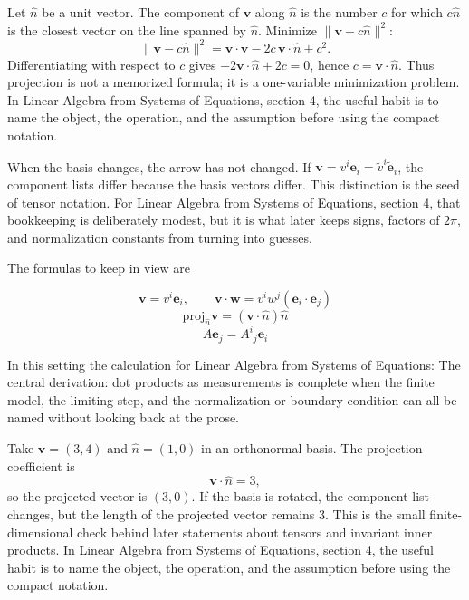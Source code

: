 Let \(\hat n\) be a unit vector.  The component of \(\bm v\) along \(\hat n\) is the number \(c\) for which \(c\hat n\) is the closest vector on the line spanned by \(\hat n\).  Minimize \(\|\bm v-c\hat n\|^2\):
\[
  \|\bm v-c\hat n\|^2=\bm v\cdot\bm v-2c\,\bm v\cdot\hat n+c^2.
\]
Differentiating with respect to \(c\) gives \(-2\bm v\cdot\hat n+2c=0\), hence \(c=\bm v\cdot\hat n\).  Thus projection is not a memorized formula; it is a one-variable minimization problem.  In Linear Algebra from Systems of Equations, section 4, the useful habit is to name the object, the operation, and the assumption before using the compact notation.

When the basis changes, the arrow has not changed.  If \(\bm v=v^i\bm e_i=\tilde v^i\tilde{\bm e}_i\), the component lists differ because the basis vectors differ.  This distinction is the seed of tensor notation.  For Linear Algebra from Systems of Equations, section 4, that bookkeeping is deliberately modest, but it is what later keeps signs, factors of \(2\pi\), and normalization constants from turning into guesses.

The formulas to keep in view are

\[
  \bm v=v^i\bm e_i,\qquad \bm v\cdot\bm w=v^iw^j(\bm e_i\cdot\bm e_j)
\]
\[
  \mathrm{proj}_{\hat n}\bm v=(\bm v\cdot\hat n)\hat n
\]
\[
  A\bm e_j=A^i{}_j\bm e_i
\]

In this setting the calculation for Linear Algebra from Systems of Equations: The central derivation: dot products as measurements is complete when the finite model, the limiting step, and the normalization or boundary condition can all be named without looking back at the prose.




\begin{example}
Take \(\bm v=(3,4)\) and \(\hat n=(1,0)\) in an orthonormal basis.  The projection coefficient is
\[
  \bm v\cdot\hat n=3,
\]
so the projected vector is \((3,0)\).  If the basis is rotated, the component list changes, but the length of the projected vector remains \(3\).  This is the small finite-dimensional check behind later statements about tensors and invariant inner products.  In Linear Algebra from Systems of Equations, section 4, the useful habit is to name the object, the operation, and the assumption before using the compact notation.
\end{example}



